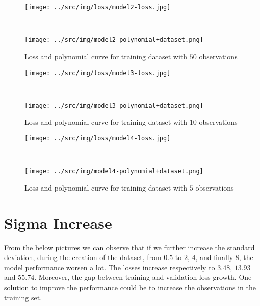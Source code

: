 \documentclass[a4paper,12pt]{article} %
\begin{document}
	\begin{figure}[H]
		\begin{minipage}[c]{.49\textwidth}
			\centering
			\texttt{[image: ../src/img/loss/model2-loss.jpg]}
		\end{minipage}
		~
		\begin{minipage}[c]{.49\textwidth}
			\centering
			\texttt{[image: ../src/img/model2-polynomial+dataset.png]}
		\end{minipage}
	\caption{Loss and polynomial curve for training dataset with $50$ 
	observations}
	\end{figure}
	
	\begin{figure}[H]
		\begin{minipage}[c]{.49\textwidth}
			\centering
			\texttt{[image: ../src/img/loss/model3-loss.jpg]}
		\end{minipage}
		~
		\begin{minipage}[c]{.49\textwidth}
			\centering
			\texttt{[image: ../src/img/model3-polynomial+dataset.png]}
		\end{minipage}
	\caption{Loss and polynomial curve for training dataset with $10$ 
		observations}
	\end{figure}
	
	\begin{figure}[H]
		\begin{minipage}[c]{.49\textwidth}
			\centering
			\texttt{[image: ../src/img/loss/model4-loss.jpg]}
		\end{minipage}
		~
		\begin{minipage}[c]{.49\textwidth}
			\centering
			\texttt{[image: ../src/img/model4-polynomial+dataset.png]}
		\end{minipage}
	\caption{Loss and polynomial curve for training dataset with $5$ 
	observations}
	\end{figure}
	
	\section{Sigma Increase}
	From the below pictures we can observe that if we further increase the  
	standard deviation, during the creation of the dataset, from $0.5$ to $2$, 
	$4$, and finally $8$, the model performance worsen a lot. The losses 
	increase respectively to $3.48$, $13.93$ and $55.74$. Moreover, the 
	gap between training and validation loss growth.
	One solution to improve the performance could be to increase the 
	observations in the training set.
	
\end{document}
